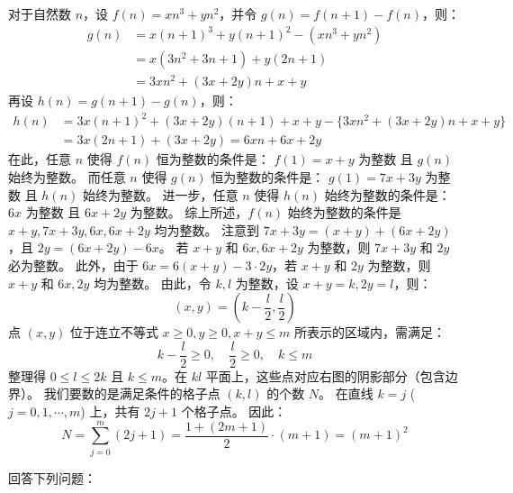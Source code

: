 \begin{questions}
\begin{solution}
    对于自然数 $n$，设 $f(n) = xn^3 + yn^2$，并令 $g(n) = f(n+1) - f(n)$，则：
    \begin{align*}
    g(n) &= x(n+1)^3 + y(n+1)^2 - (xn^3 + yn^2) \\
    &= x(3n^2 + 3n + 1) + y(2n + 1) \\
    &= 3xn^2 + (3x + 2y)n + x + y
    \end{align*}
    再设 $h(n) = g(n+1) - g(n)$，则：
    \begin{align*}
    h(n) &= 3x(n+1)^2 + (3x + 2y)(n+1) + x + y - \{3xn^2 + (3x + 2y)n + x + y\} \\
    &= 3x(2n + 1) + (3x + 2y) = 6xn + 6x + 2y
    \end{align*}
    在此，任意 $n$ 使得 $f(n)$ 恒为整数的条件是：
    $f(1) = x+y$ 为整数 且 $g(n)$ 始终为整数。
    而任意 $n$ 使得 $g(n)$ 恒为整数的条件是：
    $g(1) = 7x+3y$ 为整数 且 $h(n)$ 始终为整数。
    进一步，任意 $n$ 使得 $h(n)$ 始终为整数的条件是：
    $6x$ 为整数 且 $6x+2y$ 为整数。
    综上所述，$f(n)$ 始终为整数的条件是 $x+y, 7x+3y, 6x, 6x+2y$ 均为整数。
    注意到 $7x+3y = (x+y) + (6x+2y)$，且 $2y = (6x+2y) - 6x$。
    若 $x+y$ 和 $6x, 6x+2y$ 为整数，则 $7x+3y$ 和 $2y$ 必为整数。
    此外，由于 $6x = 6(x+y) - 3 \cdot 2y$，若 $x+y$ 和 $2y$ 为整数，则 $x+y$ 和 $6x, 2y$ 均为整数。
    由此，令 $k, l$ 为整数，设 $x+y = k, 2y = l$，则：
    \[ (x, y) = \left( k - \frac{l}{2}, \frac{l}{2} \right) \]
    点 $(x, y)$ 位于连立不等式 $x \ge 0, y \ge 0, x+y \le m$ 所表示的区域内，需满足：
    \[ k - \frac{l}{2} \ge 0, \quad \frac{l}{2} \ge 0, \quad k \le m \]
    整理得 $0 \le l \le 2k$ 且 $k \le m$。在 $kl$ 平面上，这些点对应右图的阴影部分（包含边界）。
        我们要数的是满足条件的格子点 $(k, l)$ 的个数 $N$。
    在直线 $k = j$ ($j = 0, 1, \cdots, m$) 上，共有 $2j + 1$ 个格子点。
    因此：
    \[ N = \sum_{j=0}^{m} (2j + 1) = \frac{1 + (2m + 1)}{2} \cdot (m + 1) = (m + 1)^2 \]
\end{solution}

\question
回答下列问题：

\begin{parts}

\end{parts}
\end{questions}

